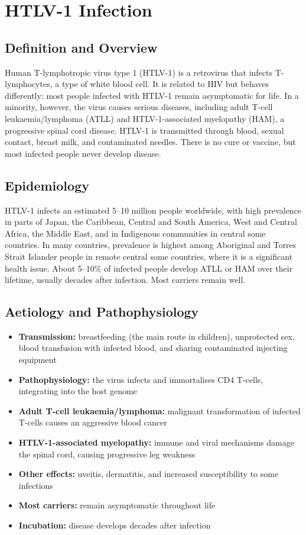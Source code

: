 \chapter{HTLV-1 Infection}

\section*{Definition and Overview}
Human T-lymphotropic virus type 1 (HTLV-1) is a retrovirus that infects T-lymphocytes, a type of white blood cell. It is related to HIV but behaves differently: most people infected with HTLV-1 remain asymptomatic for life. In a minority, however, the virus causes serious diseases, including adult T-cell leukaemia/lymphoma (ATLL) and HTLV-1-associated myelopathy (HAM), a progressive spinal cord disease. HTLV-1 is transmitted through blood, sexual contact, breast milk, and contaminated needles. There is no cure or vaccine, but most infected people never develop disease.

\section*{Epidemiology}
HTLV-1 infects an estimated 5--10 million people worldwide, with high prevalence in parts of Japan, the Caribbean, Central and South America, West and Central Africa, the Middle East, and in Indigenous communities in central some countries. In many countries, prevalence is highest among Aboriginal and Torres Strait Islander people in remote central some countries, where it is a significant health issue. About 5--10\% of infected people develop ATLL or HAM over their lifetime, usually decades after infection. Most carriers remain well.

\section*{Aetiology and Pathophysiology}
\begin{itemize}
    \item \textbf{Transmission:} breastfeeding (the main route in children), unprotected sex, blood transfusion with infected blood, and sharing contaminated injecting equipment
    \item \textbf{Pathophysiology:} the virus infects and immortalises CD4 T-cells, integrating into the host genome
    \item \textbf{Adult T-cell leukaemia/lymphoma:} malignant transformation of infected T-cells causes an aggressive blood cancer
    \item \textbf{HTLV-1-associated myelopathy:} immune and viral mechanisms damage the spinal cord, causing progressive leg weakness
    \item \textbf{Other effects:} uveitis, dermatitis, and increased susceptibility to some infections
    \item \textbf{Most carriers:} remain asymptomatic throughout life
    \item \textbf{Incubation:} disease develops decades after infection
\end{itemize}

